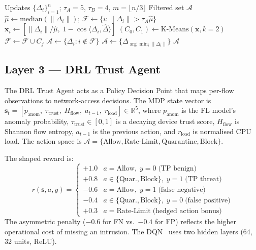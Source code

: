 \documentclass[11pt,a4paper,twocolumn]{article}
\theoremstyle{definition}
\begin{document}
\begin{algorithm}[t]
\caption{Two-Stage GMM+K-Means Update Filter}
\label{alg:filter}
\begin{algorithmic}[1]
\small
\Require Updates $\{\Delta_i\}_{i=1}^n$;\; $\tau_A{=}5$,\; $\tau_B{=}4$,\;
  $m{=}\lfloor n/3\rfloor$
\Ensure Filtered set $\mathcal{A}$
\State $\hat{\mu}\!\leftarrow\!\text{median}(\|\Delta_i\|)$;\quad
  $\mathcal{F}\!\leftarrow\!\{i:\|\Delta_i\|{>}\tau_A\hat\mu\}$
  \State $\mathbf{x}_i\!\leftarrow\![\|\Delta_i\|/\hat\mu,\;
    1{-}\cos\!\langle\Delta_i,\hat\Delta\rangle]$
  \State $(C_0,C_1)\!\leftarrow\!\text{K-Means}(\mathbf{x},k{=}2)$
      \State $\mathcal{F}\!\leftarrow\!\mathcal{F}\cup C_j$
    \EndIf
  \EndFor
\EndIf
\State $\mathcal{A}\!\leftarrow\!\{\Delta_i:i\notin\mathcal{F}\}$
 $\mathcal{A}\!\leftarrow\!\{\Delta_{\arg\min_i\|\Delta_i\|}\}$
\EndIf
\State\Return $\mathcal{A}$
\end{algorithmic}
\end{algorithm}

\subsection{Layer 3 — DRL Trust Agent}
\label{sec:layer3}

The DRL Trust Agent acts as a Policy Decision Point that maps per-flow
observations to network-access decisions.  The MDP state vector is
$\mathbf{s}_t = [p_\text{anom},\;\tau_\text{trust},\;H_\text{flow},\;
a_{t-1},\;r_\text{load}] \in \mathbb{R}^5$, where $p_\text{anom}$ is
the FL model's anomaly probability, $\tau_\text{trust}\in[0,1]$ is a
decaying device trust score, $H_\text{flow}$ is Shannon flow entropy,
$a_{t-1}$ is the previous action, and $r_\text{load}$ is normalised CPU
load.  The action space is $\mathcal{A}=\{\text{Allow},\text{Rate-Limit},
\text{Quarantine},\text{Block}\}$.

The shaped reward is:
\begin{equation}
r(\mathbf{s},a,y) =
\begin{cases}
+1.0 & a{=}\text{Allow},\;y{=}0\;\text{(TP benign)}\\
+0.8 & a{\in}\{\text{Quar.},\text{Block}\},\;y{=}1\;\text{(TP threat)}\\
-0.6 & a{=}\text{Allow},\;y{=}1\;\text{(false negative)}\\
-0.4 & a{\in}\{\text{Quar.},\text{Block}\},\;y{=}0\;\text{(false positive)}\\
+0.3 & a{=}\text{Rate-Limit}\;\text{(hedged action bonus)}
\end{cases}
\label{eq:reward}
\end{equation}
The asymmetric penalty ($-0.6$ for FN vs.\ $-0.4$ for FP) reflects the
higher operational cost of missing an intrusion.  The DQN~\cite{mnih2015}
uses two hidden layers (64, 32 units, ReLU).
\end{document}
